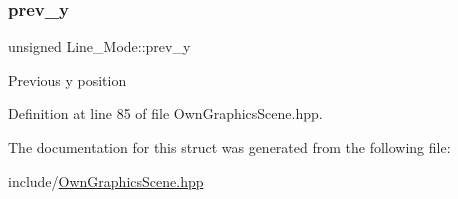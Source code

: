 \subsubsection{\texorpdfstring{prev\+\_\+y}{prev\_y}}
{\footnotesize\ttfamily unsigned Line\+\_\+\+Mode\+::prev\+\_\+y}

Previous y position 

Definition at line 85 of file Own\+Graphics\+Scene.\+hpp.



The documentation for this struct was generated from the following file\+:\begin{DoxyCompactItemize}
\item 
include/\mbox{\hyperlink{OwnGraphicsScene_8hpp}{Own\+Graphics\+Scene.\+hpp}}\end{DoxyCompactItemize}
